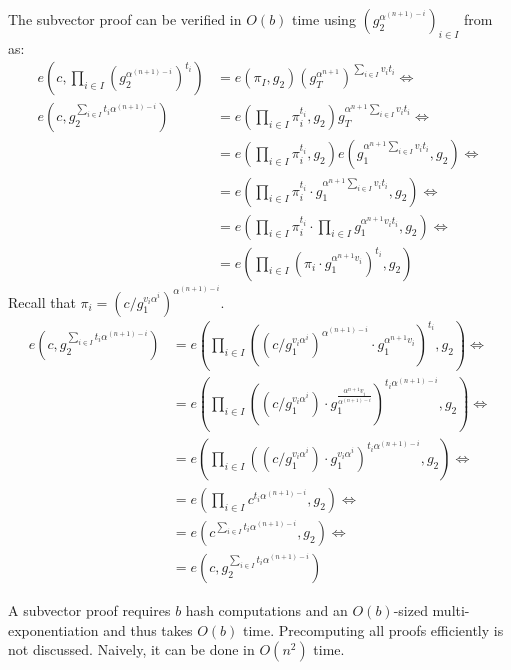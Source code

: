 The subvector proof can be verified in $O(b)$ time using $(g_2^{\alpha^{(n+1) - i}})_{i\in I}$ from \vrk as:
\begin{align}
e\left(c, \prod_{i\in I}\left(g_2^{\alpha^{(n+1)-i}}\right)^{t_i}\right) &= e(\pi_I, g_2) \left(g_T^{\alpha^{n+1}}\right)^{\sum_{i\in I} v_i t_i}\Leftrightarrow\\
e\left(c, g_2^{\sum _{i\in I}t_i \alpha^{(n+1)-i}}\right) &= e\left(\prod_{i\in I} \pi_i^{t_i}, g_2\right) g_T^{\alpha^{n+1}\sum_{i\in I} v_i t_i}\Leftrightarrow\\
 &= e\left(\prod_{i\in I} \pi_i^{t_i}, g_2\right) e\left(g_1^{\alpha^{n+1}\sum_{i\in I} v_i t_i}, g_2\right)\Leftrightarrow\\
 &= e\left(\prod_{i\in I} \pi_i^{t_i} \cdot g_1^{\alpha^{n+1}\sum_{i\in I} v_i t_i},g_2\right)\Leftrightarrow\\
 &= e\left(\prod_{i\in I} \pi_i^{t_i} \cdot \prod_{i\in I} g_1^{\alpha^{n+1} v_i t_i},g_2\right)\Leftrightarrow\\
 &= e\left(\prod_{i\in I} \left(\pi_i \cdot g_1^{\alpha^{n+1} v_i}\right)^{t_i},g_2\right)
\end{align}
Recall that $\pi_i= (c / g_1^{v_i \alpha^i})^{\alpha^{(n+1) - i}}$.
\begin{align}
e\left(c, g_2^{\sum _{i\in I}t_i \alpha^{(n+1)-i}}\right) &= e\left(\prod_{i\in I} \left((c / g_1^{v_i \alpha^i})^{\alpha^{(n+1) - i}} \cdot g_1^{\alpha^{n+1} v_i}\right)^{t_i},g_2\right)\Leftrightarrow\\
 &= e\left(\prod_{i\in I} \left((c / g_1^{v_i \alpha^i}) \cdot g_1^\frac{\alpha^{n+1} v_i}{\alpha^{(n+1) - i}}\right)^{t_i \alpha^{(n+1) - i}},g_2\right)\Leftrightarrow\\
 &= e\left(\prod_{i\in I} \left((c / g_1^{v_i \alpha^i}) \cdot g_1^{v_i\alpha^i}\right)^{t_i \alpha^{(n+1) - i}},g_2\right)\Leftrightarrow\\
 &= e\left(\prod_{i\in I} c^{t_i \alpha^{(n+1) - i}},g_2\right)\Leftrightarrow\\
 &= e\left( c^{\sum_{i\in I}t_i \alpha^{(n+1) - i}},g_2\right)\Leftrightarrow\\
 &= e\left( c,g_2^{\sum_{i\in I}t_i \alpha^{(n+1) - i}}\right)
\end{align}

A subvector proof requires $b$ hash computations and an $O(b)$-sized multi-exponentiation and thus takes $O(b)$ time.
Precomputing all proofs efficiently is not discussed.
Naively, it can be done in $O(n^2)$ time.

